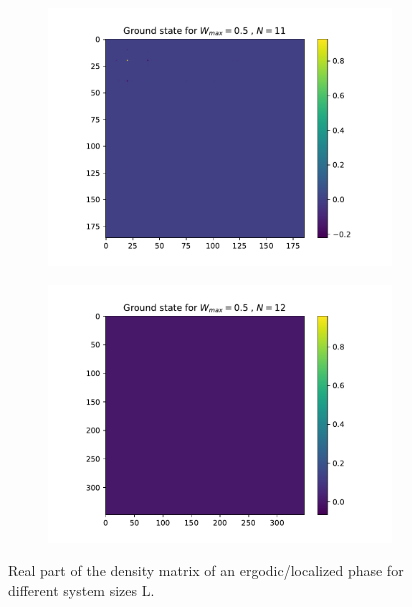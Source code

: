 \documentclass[reprint,amsmath,amssymb,aps,prb]{revtex4-2}
\begin{document}
\begin{figure}[h!]
\begin{subfigure}[c]{0.3\textwidth}
		\includegraphics[width=\textwidth]{../results/N11_trainingset_groundstate_Wmax8.0.pdf}
	\end{subfigure}
	\begin{subfigure}[c]{0.3\textwidth}
		\includegraphics[width=\textwidth]{../results/N12_trainingset_groundstate_Wmax8.0.pdf}
	\end{subfigure}
	\caption{Real part of the density matrix of an ergodic/localized phase for different system sizes L.}
\end{figure}


\end{document}
